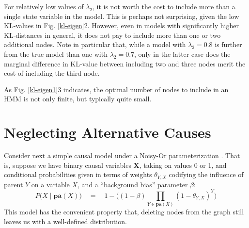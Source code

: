 \documentclass[10pt,letterpaper]{article}
\begin{document}
\noindent For relatively low values of $\lambda_2$, it is not worth the cost to include more than a single state variable in the model. This is perhaps not surprising, given the low KL-values in Fig. \ref{kl-eigen}2. However, even in models with significantly higher KL-distances in general, it does not pay to include more than one or two additional nodes. Note in particular that, while a model with $\lambda_2=0.8$ is further from the true model than one with $\lambda_2=0.7$, only in the latter case does the marginal difference in KL-value between including two and three nodes merit the cost of including the third node. 

As Fig. \ref{kl-eigen1}3 indicates, the optimal number of nodes to include in an HMM is not only finite, but typically quite small.

\section{Neglecting Alternative Causes}

Consider next a simple causal model under a Noisy-Or parameterization \citep{Cheng}. That is, suppose we have binary causal variables $\textbf{X}$, taking on values 0 or 1, and conditional probabilities given in terms of weights $\theta_{Y,X}$ codifying the influence of parent $Y$ on a variable $X$, and a ``background bias'' parameter $\beta$: $$P\big(X\mid \textbf{pa}(X)\big) \quad = \quad 1-\Big((1-\beta)\prod_{Y \in \textbf{pa}(X)} (1-\theta_{Y,X})^Y\Big)$$
This model has the convenient property that, deleting nodes from the graph still leaves us with a well-defined distribution.
\end{document}
